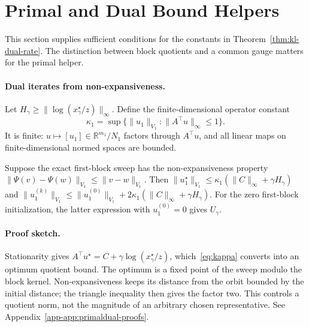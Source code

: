 \section{Primal and Dual Bound Helpers}\label{sec:dual-primal-dual}
This section supplies sufficient conditions for the constants in Theorem~\ref{thm:kl-dual-rate}. The distinction between block quotients and a common gauge matters for the primal helper.
\paragraph{Dual iterates from non-expansiveness.}
Let $H_\gamma\geq\|\log(x_\gamma^\star/z)\|_\infty$. Define the finite-dimensional operator constant
\begin{equation}\label{eq:kappa}
\kappa_1=\sup\{\|u_1\|_{V_1}:\|A^\top u\|_\infty\leq1\}.
\end{equation}
It is finite: $u\mapsto[u_1]\in\mathbb R^{m_1}/N_1$ factors through $A^\top u$, and all linear maps on finite-dimensional normed spaces are bounded.
\begin{proposition}\label{prop:uniform-iter-final}
Suppose the exact first-block sweep has the non-expansiveness property $\|\Psi(v)-\Psi(w)\|_{V_1}\leq\|v-w\|_{V_1}$. Then
$\|u_1^\star\|_{V_1}\leq\kappa_1(\|C\|_\infty+\gamma H_\gamma)$ and
$\|u_1^{(k)}\|_{V_1}\leq\|u_1^{(0)}\|_{V_1}+2\kappa_1(\|C\|_\infty+\gamma H_\gamma)$.
For the zero first-block initialization, the latter expression with $u_1^{(0)}=0$ gives $U_\gamma$.
\end{proposition}
\paragraph{Proof sketch.}
Stationarity gives $A^\top u^\star=C+\gamma\log(x_\gamma^\star/z)$, which~\eqref{eq:kappa} converts into an optimum quotient bound. The optimum is a fixed point of the sweep modulo the block kernel. Non-expansiveness keeps its distance from the orbit bounded by the initial distance; the triangle inequality then gives the factor two. This controls a quotient norm, not the magnitude of an arbitrary chosen representative. See Appendix~\ref{app-app:primaldual-proofs}.

